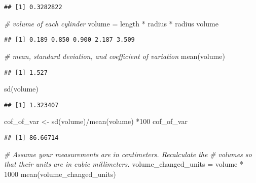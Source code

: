 \documentclass[
]{article}
\newenvironment{Shaded}{\begin{snugshade}}{\end{snugshade}}
\newcommand{\CommentTok}[1]{\textcolor[rgb]{0.56,0.35,0.01}{\textit{#1}}}
\newcommand{\DecValTok}[1]{\textcolor[rgb]{0.00,0.00,0.81}{#1}}
\newcommand{\FunctionTok}[1]{\textcolor[rgb]{0.00,0.00,0.00}{#1}}
\newcommand{\NormalTok}[1]{#1}
\newcommand{\OtherTok}[1]{\textcolor[rgb]{0.56,0.35,0.01}{#1}}
\newcommand{\SpecialCharTok}[1]{\textcolor[rgb]{0.00,0.00,0.00}{#1}}
\begin{document}
\begin{verbatim}
## [1] 0.3282822
\end{verbatim}

\begin{Shaded}
\begin{Highlighting}[]
\CommentTok{\# volume of each cylinder}
\NormalTok{volume }\OtherTok{=}\NormalTok{ length }\SpecialCharTok{*}\NormalTok{ radius }\SpecialCharTok{*}\NormalTok{ radius}
\NormalTok{volume}
\end{Highlighting}
\end{Shaded}

\begin{verbatim}
## [1] 0.189 0.850 0.900 2.187 3.509
\end{verbatim}

\begin{Shaded}
\begin{Highlighting}[]
\CommentTok{\# mean, standard deviation, and coefficient of variation}
\FunctionTok{mean}\NormalTok{(volume)}
\end{Highlighting}
\end{Shaded}

\begin{verbatim}
## [1] 1.527
\end{verbatim}

\begin{Shaded}
\begin{Highlighting}[]
\FunctionTok{sd}\NormalTok{(volume)}
\end{Highlighting}
\end{Shaded}

\begin{verbatim}
## [1] 1.323407
\end{verbatim}

\begin{Shaded}
\begin{Highlighting}[]
\NormalTok{cof\_of\_var }\OtherTok{\textless{}{-}} \FunctionTok{sd}\NormalTok{(volume)}\SpecialCharTok{/}\FunctionTok{mean}\NormalTok{(volume) }\SpecialCharTok{*}\DecValTok{100} 
\NormalTok{cof\_of\_var}
\end{Highlighting}
\end{Shaded}

\begin{verbatim}
## [1] 86.66714
\end{verbatim}

\begin{Shaded}
\begin{Highlighting}[]
\CommentTok{\# Assume your measurements are in centimeters. Recalculate the}
\CommentTok{\# volumes so that their units are in cubic millimeters. }
\NormalTok{volume\_changed\_units }\OtherTok{=}\NormalTok{ volume }\SpecialCharTok{*} \DecValTok{1000}
\FunctionTok{mean}\NormalTok{(volume\_changed\_units)}
\end{Highlighting}
\end{Shaded}
\end{document}

